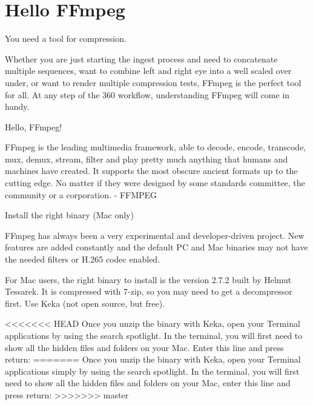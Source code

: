 \chapter{Hello FFmpeg}
\pagecolor{white}
\label{chap:56}
\begin{fullwidth}

\problem

{\large You need a tool for compression. \par}

Whether you are just starting the ingest process and need to concatenate multiple sequences, want to combine left and right eye into a well scaled over under, or want to render multiple compression tests, FFmpeg is the perfect tool for all. At any step of the 360 workflow, understanding FFmpeg will come in handy.

\solutions

{\large Hello, FFmpeg! \par}

FFmpeg is the leading multimedia framework, able to decode, encode, transcode, mux, demux, stream, filter and play pretty much anything that humans and machines have created. It supports the most obscure ancient formats up to the cutting edge. No matter if they were designed by some standards committee, the community or a corporation. - FFMPEG

{\large Install the right binary (Mac only) \par}

FFmpeg has always been a very experimental and developer-driven project. New features are added constantly and the default PC and Mac binaries may not have the needed filters or H.265 codec enabled. 

For Mac users, the right binary to install is the version 2.7.2 built by Helmut Tessarek. It is compressed with 7-zip, so you may need to get a decompressor first. Use Keka (not open source, but free).

<<<<<<< HEAD
Once you unzip the binary with Keka, open your Terminal applications by using the search spotlight. In the terminal, you will first need to show all the hidden files and folders on your Mac. Enter this line and press return:
=======
Once you unzip the binary with Keka, open your Terminal applications simply by using the search spotlight. In the terminal, you will first need to show all the hidden files and folders on your Mac, enter this line and press return:
>>>>>>> master



\end{fullwidth}
